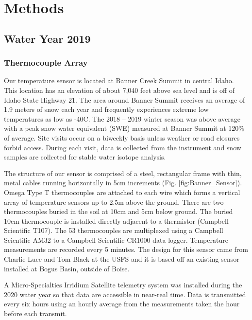 \chapter{Methods}
\section{Water Year 2019} 
\subsection{Thermocouple Array}
Our temperature sensor is located at Banner Creek Summit in central Idaho. This location has an elevation of about 7,040 feet above sea level and is off of Idaho State Highway 21. The area around Banner Summit receives an average of 1.9 meters of snow each year and frequently experiences extreme low temperatures as low as -40\textdegree C. The 2018 -- 2019 winter season was above average with a peak snow water equivalent (SWE) measured at Banner Summit at 120\% of average. Site visits occur on a biweekly basis unless weather or road closures forbid access. During each visit, data is collected from the instrument and snow samples are collected for stable water isotope analysis.

The structure of our sensor is comprised of a steel, rectangular frame with thin, metal cables running horizontally in 5cm increments (Fig. \ref{fig:Banner_Sensor}). Omega Type T thermocouples are attached to each wire which forms a vertical array of temperature sensors up to 2.5m above the ground. There are two thermocouples buried in the soil at 10cm and 5cm below ground. The buried 10cm thermocouple is installed directly adjacent to a thermistor (Campbell Scientific T107). The 53 thermocouples are multiplexed using a Campbell Scientific AM32 to a Campbell Scientific CR1000 data logger. Temperature measurements are recorded every 5 minutes. The design for this sensor came from Charlie Luce and Tom Black at the USFS and it is based off an existing sensor installed at Bogus Basin, outside of Boise. 

A Micro-Specialties Irridium Satellite telemetry system was installed during the 2020 water year so that data are accessible in near-real time. Data is transmitted every six hours using an hourly average from the measurements taken the hour before each transmit.

